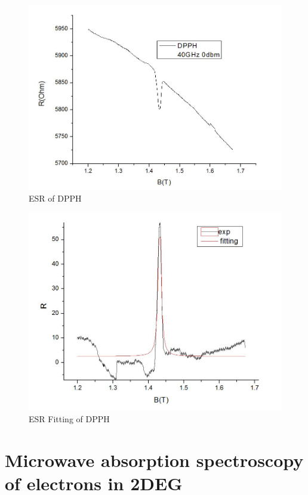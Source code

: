 \documentclass[12pt]{ruthesis}
\begin{document}
\begin{figure}
  \centering
  \includegraphics[scale=0.5]{figures/dpph_esr.JPG}
  \caption{ESR of DPPH}
  \label{dpph_esr}
\end{figure}
 
 
\begin{figure}
  \centering
  \includegraphics[scale=0.5]{figures/dpph_fitting.JPG}
  \caption{ESR Fitting of DPPH}
  \label{dpph_fitting}
\end{figure}
 









\chapter{Microwave absorption spectroscopy of electrons in 2DEG}\label{Absorption}
\end{document}
